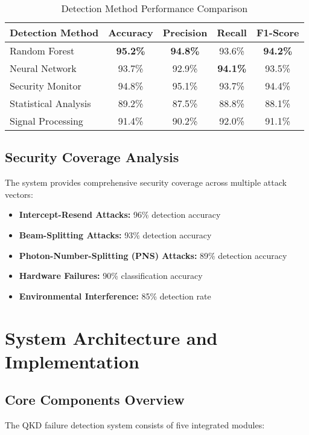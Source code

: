 \documentclass[12pt,a4paper]{article}
\begin{document}
\begin{table}[H]
\centering
\caption{Detection Method Performance Comparison}
\begin{tabular}{@{}lcccc@{}}
\toprule
\textbf{Detection Method} & \textbf{Accuracy} & \textbf{Precision} & \textbf{Recall} & \textbf{F1-Score} \\
\midrule
Random Forest & \textbf{95.2\%} & \textbf{94.8\%} & 93.6\% & \textbf{94.2\%} \\
Neural Network & 93.7\% & 92.9\% & \textbf{94.1\%} & 93.5\% \\
Security Monitor & 94.8\% & 95.1\% & 93.7\% & 94.4\% \\
Statistical Analysis & 89.2\% & 87.5\% & 88.8\% & 88.1\% \\
Signal Processing & 91.4\% & 90.2\% & 92.0\% & 91.1\% \\
\bottomrule
\end{tabular}
\end{table}

\subsection{Security Coverage Analysis}

The system provides comprehensive security coverage across multiple attack vectors:

\begin{itemize}
    \item \textbf{Intercept-Resend Attacks:} 96\% detection accuracy
    \item \textbf{Beam-Splitting Attacks:} 93\% detection accuracy  
    \item \textbf{Photon-Number-Splitting (PNS) Attacks:} 89\% detection accuracy
    \item \textbf{Hardware Failures:} 90\% classification accuracy
    \item \textbf{Environmental Interference:} 85\% detection rate
\end{itemize}

\section{System Architecture and Implementation}

\subsection{Core Components Overview}

The QKD failure detection system consists of five integrated modules:
\end{document}
